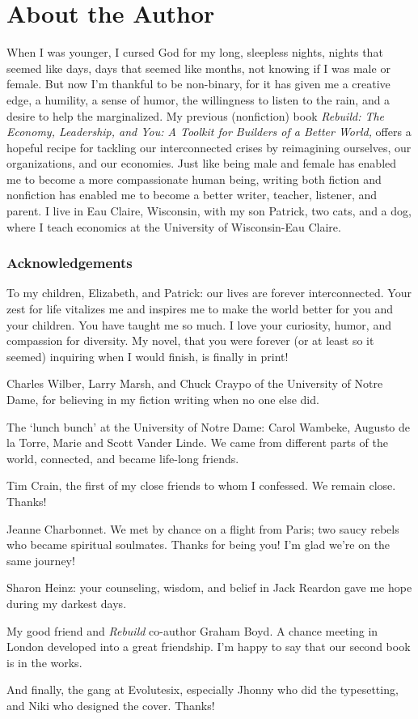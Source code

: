 \chapter*{About the Author}

When I was younger, I cursed God for my long, sleepless nights, nights
that seemed like days, days that seemed like months, not knowing if I
was male or female. But now I'm thankful to be non-binary, for it has
given me a creative edge, a humility, a sense of humor, the willingness
to listen to the rain, and a desire to help the marginalized. My
previous (nonfiction) book \emph{Rebuild: The Economy, Leadership, and
You: A Toolkit for Builders of a Better World,} offers a hopeful recipe
for tackling our interconnected crises by reimagining ourselves, our
organizations, and our economies. Just like being male and female has
enabled me to become a more compassionate human being, writing both
fiction and nonfiction has enabled me to become a better writer,
teacher, listener, and parent. I live in Eau Claire, Wisconsin, with my
son Patrick, two cats, and a dog, where I teach economics at the
University of Wisconsin-Eau Claire.

\subsection*{Acknowledgements}

To my children, Elizabeth, and Patrick: our lives are forever
interconnected. Your zest for life vitalizes me and inspires me to make
the world better for you and your children. You have taught me so much.
I love your curiosity, humor, and compassion for diversity. My novel,
that you were forever (or at least so it seemed) inquiring when I would
finish, is finally in print!

Charles Wilber, Larry Marsh, and Chuck Craypo of the University of Notre
Dame, for believing in my fiction writing when no one else did.

The `lunch bunch' at the University of Notre Dame: Carol Wambeke,
Augusto de la Torre, Marie and Scott Vander Linde. We came from
different parts of the world, connected, and became life-long friends.

Tim Crain, the first of my close friends to whom I confessed. We remain
close. Thanks!

Jeanne Charbonnet. We met by chance on a flight from Paris; two saucy
rebels who became spiritual soulmates. Thanks for being you! I'm glad
we're on the same journey!

Sharon Heinz: your counseling, wisdom, and belief in Jack Reardon gave
me hope during my darkest days.

My good friend and \emph{Rebuild} co-author Graham Boyd. A chance
meeting in London developed into a great friendship. I'm happy to say
that our second book is in the works.

And finally, the gang at Evolutesix, especially Jhonny who did the
typesetting, and Niki who designed the cover. Thanks!
